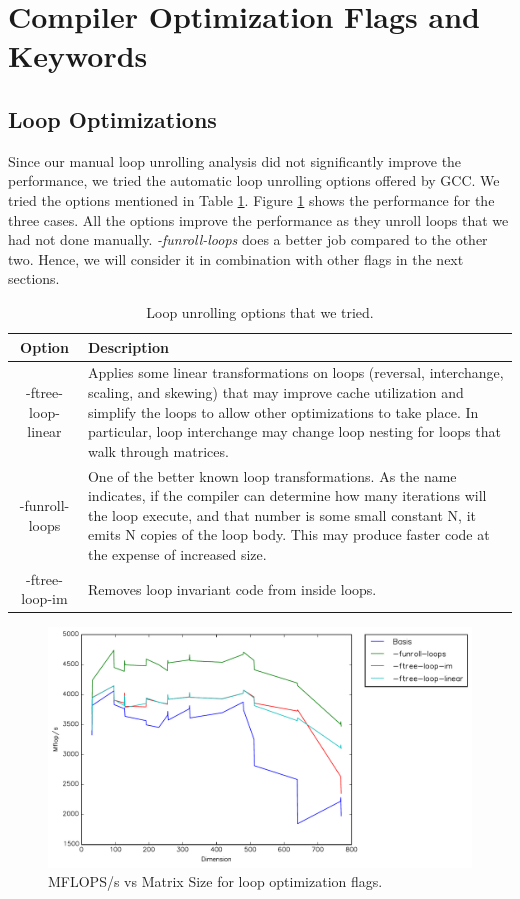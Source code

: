 \documentclass{article}
\begin{document}
\section{Compiler Optimization Flags and Keywords}

\subsection{Loop Optimizations}

Since our manual loop unrolling analysis did not significantly improve the performance, we tried the automatic loop unrolling options offered by GCC. We tried the options mentioned in Table \ref{loop-unrolling}. Figure \ref{fig:timing-loops} shows the performance for the three cases. All the options improve the performance as they unroll loops that we had not done manually. \textit{-funroll-loops} does a better job compared to the other two. Hence, we will consider it in combination with other flags in the next sections.


\begin{table}
\begin{center}
    \begin{tabular}{ | c | p{10cm} |}
    \hline
    Option & Description \\ \hline
    -ftree-loop-linear  & Applies some linear transformations on loops (reversal, interchange, scaling, and skewing) that may improve cache utilization and simplify the loops to allow other optimizations to take place. In particular, loop interchange may change loop nesting for loops that walk through matrices. \\ \hline
    -funroll-loops &  One of the better known loop transformations. As the name indicates, if the compiler can determine how many iterations will the loop execute, and that number is some small constant N, it emits N copies of the loop body. This may produce faster code at the expense of increased size. \\
    \hline
    -ftree-loop-im & Removes loop invariant code from inside loops. \\ \hline
    \end{tabular}
    \caption{Loop unrolling options that we tried.}
    \label{loop-unrolling}
\end{center}
\end{table}

  \begin{figure}[h]
    \centering
    \includegraphics[width=.7\textwidth]{timing-loops.pdf}
    \caption{MFLOPS/s vs Matrix Size for loop optimization flags.}
    \label{fig:timing-loops}
  \end{figure}
\end{document}
